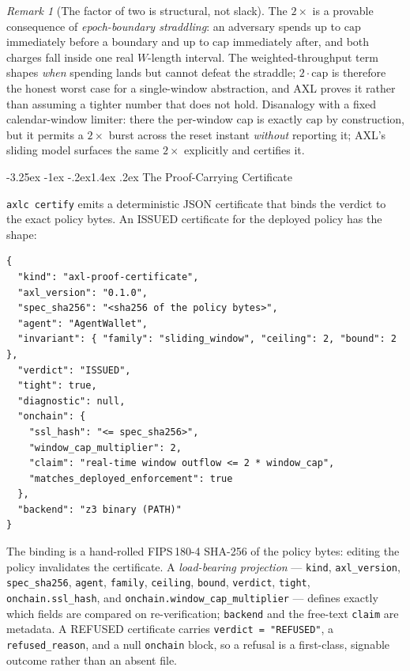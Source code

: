 \documentclass[11pt]{article}
\makeatletter
\renewcommand\section{\@startsection{section}{1}{\z@}%
  {-3.25ex \@plus -1ex \@minus -.2ex}{1.4ex \@plus.2ex}%
  {\normalfont\sffamily\Large\bfseries}}
\theoremstyle{plain}
\theoremstyle{definition}
\theoremstyle{remark}
\newtheorem*{remark}{Remark}
\makeatother
\begin{document}
\begin{remark}[The factor of two is structural, not slack]
The $2\times$ is a provable consequence of \emph{epoch-boundary straddling}:
an adversary spends up to $\text{cap}$ immediately before a boundary and up to
$\text{cap}$ immediately after, and both charges fall inside one real
$W$-length interval. The weighted-throughput term shapes \emph{when} spending
lands but cannot defeat the straddle; $2\cdot\text{cap}$ is therefore the
honest worst case for a single-window abstraction, and AXL proves it rather
than assuming a tighter number that does not hold. Disanalogy with a fixed
calendar-window limiter: there the per-window cap is exactly $\text{cap}$ by
construction, but it permits a $2\times$ burst across the reset instant
\emph{without} reporting it; AXL's sliding model surfaces the same $2\times$
explicitly and certifies it.
\end{remark}

\section{The Proof-Carrying Certificate}\label{sec:certificate}

\texttt{axlc certify} emits a deterministic JSON certificate that binds the
verdict to the exact policy bytes. An ISSUED certificate for the deployed
policy has the shape:

\begin{lstlisting}
{
  "kind": "axl-proof-certificate",
  "axl_version": "0.1.0",
  "spec_sha256": "<sha256 of the policy bytes>",
  "agent": "AgentWallet",
  "invariant": { "family": "sliding_window", "ceiling": 2, "bound": 2 },
  "verdict": "ISSUED",
  "tight": true,
  "diagnostic": null,
  "onchain": {
    "ssl_hash": "<= spec_sha256>",
    "window_cap_multiplier": 2,
    "claim": "real-time window outflow <= 2 * window_cap",
    "matches_deployed_enforcement": true
  },
  "backend": "z3 binary (PATH)"
}
\end{lstlisting}

\noindent The binding is a hand-rolled FIPS\,180-4 SHA-256 of the policy bytes:
editing the policy invalidates the certificate. A \emph{load-bearing
projection} --- \texttt{kind}, \texttt{axl\_version}, \texttt{spec\_sha256},
\texttt{agent}, \texttt{family}, \texttt{ceiling}, \texttt{bound},
\texttt{verdict}, \texttt{tight}, \texttt{onchain.ssl\_hash}, and
\texttt{onchain.window\_cap\_multiplier} --- defines exactly which fields are
compared on re-verification; \texttt{backend} and the free-text \texttt{claim}
are metadata. A REFUSED certificate carries \texttt{verdict = "REFUSED"}, a
\texttt{refused\_reason}, and a null \texttt{onchain} block, so a refusal is a
first-class, signable outcome rather than an absent file.
\end{document}
